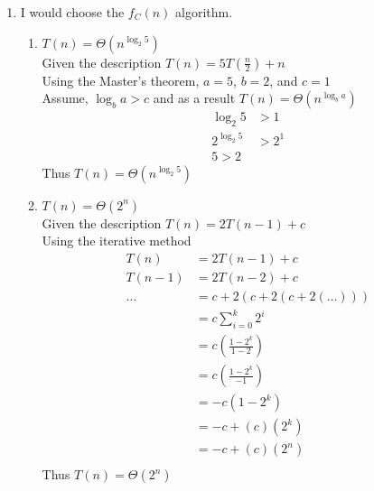 \documentclass[paper=a4, fontsize=11pt]{scrartcl} %
\numberwithin{equation}{section} %
\numberwithin{figure}{section} %
\numberwithin{table}{section} %
\begin{document}
\begin{enumerate}
    \item I would choose the $f_C(n)$ algorithm. \\
    \begin{enumerate}
        \item $T(n) = \Theta\left(n^{\log_2{5}}\right)$ \\
        Given the description $T(n) = 5T\left(\frac{ n }{ 2 }\right) + n$ \\
        Using the Master's theorem, $a = 5$, $b = 2$, and $c = 1$ \\
        Assume, $\log_b{a} > c$ and as a result 
        $T(n) = \Theta\left(n^{\log_b{a}}\right)$
        \begin{align*}
            \log_2{5} & > 1 \\
            2^{\log_2{5}} & > 2^1 \\
            5 > 2
        \end{align*}
        Thus $T(n) = \Theta\left(n^{\log_2{5}}\right)$

        \item $T(n) = \Theta\left(2^n\right)$ \\
        Given the description $T(n) = 2T\left(n - 1\right) + c$ \\
        Using the iterative method
        \begin{align*}
            T(n) & = 2T\left(n - 1\right) + c \\
            T(n - 1) & = 2T\left(n - 2\right) + c \\
            \ldots & = c + 2(c + 2(c + 2(\ldots))) \\
            & = c\sum\limits_{i=0}^k 2^i \\
            & = c\left(\frac{ 1 - 2^k}{ 1 - 2 }\right) \\
            & = c\left(\frac{ 1 - 2^k}{ -1 }\right) \\
            & = -c\left(1 - 2^k\right) \\
            & = -c + (c)(2^k) \\
            & = -c + (c)(2^n) \\
        \end{align*}
        Thus $T(n) = \Theta\left(2^n\right)$


\end{enumerate}
\end{enumerate}
\end{document}
